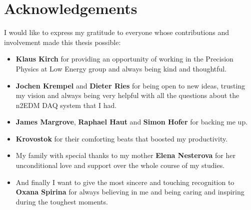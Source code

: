 \chapter{Acknowledgements}

I would like to express my gratitude to everyone whose contributions and involvement made this thesis possible:

\begin{itemize}
	\item \textbf{Klaus Kirch} for providing an opportunity of working in the Precision Physics at Low Energy group and always being kind and thoughtful.
	\item \textbf{Jochen Krempel} and \textbf{Dieter Ries} for being open to new ideas, trusting my vision and always being very helpful with all the questions about the n2EDM DAQ system that I had.
	\item \textbf{James Margrove}, \textbf{Raphael Haut} and \textbf{Simon Hofer} for backing me up.
	\item \textbf{Krovostok} for their comforting beats that boosted my productivity.
	\item My family with special thanks to my mother \textbf{Elena Nesterova} for her unconditional love and support over the whole course of my studies.
	\item And finally I want to give the most sincere and touching recognition to \textbf{Oxana Spirina} for always believing in me and being caring and inspiring during the toughest moments.
\end{itemize}
